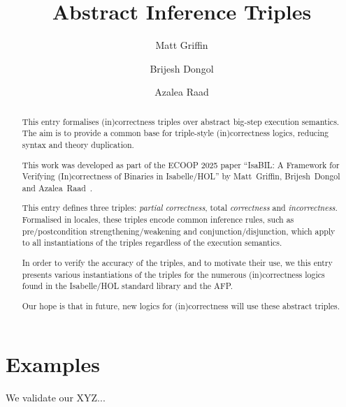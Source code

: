 \documentclass[11pt,a4paper]{article}
\begin{document}
\title{Abstract Inference Triples}
\author{Matt Griffin \and Brijesh Dongol \and Azalea Raad}
\maketitle

\begin{abstract}
  This entry formalises (in)correctness triples over abstract big-step execution semantics. 
  The aim is to provide a common base for triple-style (in)correctness logics, reducing syntax and 
  theory duplication.

  This work was developed as part of the ECOOP 2025 paper ``IsaBIL: A Framework for Verifying 
  (In)correctness of Binaries in Isabelle/HOL'' by Matt~Griffin, Brijesh~Dongol and 
  Azalea~Raad~\cite{LNCS2283}.

  This entry defines three triples: \emph{partial correctness}, total \emph{correctness} and \emph{incorrectness}.
  Formalised in locales, these triples encode common inference rules, such as pre/postcondition 
  strengthening/weakening and conjunction/disjunction, which apply to all instantiations of the 
  triples regardless of the execution semantics.

  In order to verify the accuracy of the triples, and to motivate their use, we this entry presents 
  various instantiations of the triples for the numerous (in)correctness logics found
  in the Isabelle/HOL standard library and the AFP.

  Our hope is that in future, new logics for (in)correctness will use these abstract triples.

\end{abstract}

\tableofcontents



\section{Examples}

We validate our XYZ...



\end{document}
